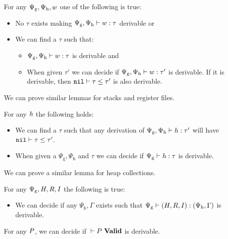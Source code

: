 \begin{lemma}
  For any $\Psi_{\mathrm{g}},\Psi_{\mathrm{h}},w$ one of the following
  is true:

  \begin{itemize}
  \item No $\tau$ exists making
    ${\Psi_{\mathrm{g}},\Psi_{\mathrm{h}}} |- {w} : {\tau}$ derivable or
  \item We can find a $\tau$ such that:
    \begin{itemize}
    \item ${\Psi_{\mathrm{g}},\Psi_{\mathrm{h}}} |- {w} : {\tau}$ is
      derivable and
    \item When given $\tau'$ we can decide if
      ${\Psi_{\mathrm{g}},\Psi_{\mathrm{h}}} |- {w} : {\tau'}$ is
      derivable. If it is derivable, then ${\mathtt{nil}} |- {\tau} \le {\tau'}$ is also
      derivable.
    \end{itemize}
  \end{itemize}

  We can prove similar lemmas for stacks and register files.
\end{lemma}

\begin{lemma}
  For any $h$ the following holds:

  \begin{itemize}
  \item We can find a $\tau$ such that any derivation of
    ${\Psi_{\mathrm{g}},\Psi_{\mathrm{h}}} |- {h} : {\tau'}$ will have
    ${\mathtt{nil}} |- {\tau} \le {\tau'}$.
  \item When given a $\Psi_{\mathrm{g}},\Psi_{\mathrm{h}}$ and $\tau$ we can
    decide if ${\Psi_{\mathrm{g}}} |- {h} : {\tau}$ is derivable.
  \end{itemize}

  We can prove a similar lemma for heap collections.
\end{lemma}

\begin{lemma}
  For any $\Psi_{\mathrm{g}},H, R, I$ the following is true:

  \begin{itemize}
  \item We can decide if any $\Psi_{\mathrm{h}},\Gamma$ exists such that
    ${\Psi_{\mathrm{g}}} |- {(H, R, I)} : {(\Psi_{\mathrm{h}},\Gamma)}$ is derivable.
  \end{itemize}
\end{lemma}

\begin{lemma}
  For any $P$, we can decide if ${} |- {P}\ \mathbf{Valid}$ is derivable.
\end{lemma}
